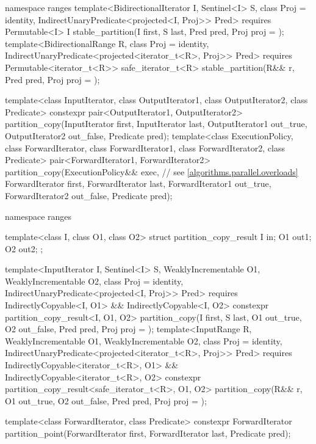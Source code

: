 \begin{codeblock}
{  namespace ranges {
    template<BidirectionalIterator I, Sentinel<I> S, class Proj = identity,
        IndirectUnaryPredicate<projected<I, Proj>> Pred>
      requires Permutable<I>
      I stable_partition(I first, S last, Pred pred, Proj proj = {});
    template<BidirectionalRange R, class Proj = identity,
        IndirectUnaryPredicate<projected<iterator_t<R>, Proj>> Pred>
      requires Permutable<iterator_t<R>>
      safe_iterator_t<R> stable_partition(R&& r, Pred pred, Proj proj = {});
  }

  template<class InputIterator, class OutputIterator1,
           class OutputIterator2, class Predicate>
    constexpr pair<OutputIterator1, OutputIterator2>
      partition_copy(InputIterator first, InputIterator last,
                     OutputIterator1 out_true, OutputIterator2 out_false,
                     Predicate pred);
  template<class ExecutionPolicy, class ForwardIterator, class ForwardIterator1,
           class ForwardIterator2, class Predicate>
    pair<ForwardIterator1, ForwardIterator2>
      partition_copy(ExecutionPolicy&& exec, // see \ref{algorithms.parallel.overloads}
                     ForwardIterator first, ForwardIterator last,
                     ForwardIterator1 out_true, ForwardIterator2 out_false,
                     Predicate pred);

  namespace ranges {
    template<class I, class O1, class O2>
    struct partition_copy_result {
      I  in;
      O1 out1;
      O2 out2;
    };

    template<InputIterator I, Sentinel<I> S, WeaklyIncrementable O1, WeaklyIncrementable O2,
        class Proj = identity, IndirectUnaryPredicate<projected<I, Proj>> Pred>
      requires IndirectlyCopyable<I, O1> && IndirectlyCopyable<I, O2>
      constexpr partition_copy_result<I, O1, O2>
        partition_copy(I first, S last, O1 out_true, O2 out_false, Pred pred,
                       Proj proj = {});
    template<InputRange R, WeaklyIncrementable O1, WeaklyIncrementable O2,
        class Proj = identity,
        IndirectUnaryPredicate<projected<iterator_t<R>, Proj>> Pred>
      requires IndirectlyCopyable<iterator_t<R>, O1> &&
        IndirectlyCopyable<iterator_t<R>, O2>
      constexpr partition_copy_result<safe_iterator_t<R>, O1, O2>
        partition_copy(R&& r, O1 out_true, O2 out_false, Pred pred, Proj proj = {});
  }

  template<class ForwardIterator, class Predicate>
    constexpr ForwardIterator
      partition_point(ForwardIterator first, ForwardIterator last,
                      Predicate pred);

}
\end{codeblock}
